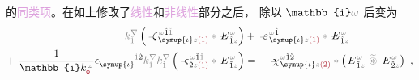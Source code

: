 的\textcolor{Plum}{同类项}。在如上修改了\textcolor{Plum}{线性}和\textcolor{Plum}{非线性}部分之后， 除以 $\mathbb{i} \mathcolor{gray}{\omega}$ 后变为
\begin{subequations}
\begin{align}
	\mathcolor{gray}{k^\nabla_{\check{1}}} \left( \xint{\begin{smallmatrix} ~ \\ {}^{}_{\mathcolor{gray}{-}} \\ ~ \end{smallmatrix}}{12}{\zeta}^{\;\! \mathcolor{gray}{\omega} \hat{1} \mathcolor{gray}{\check{1}}}_{\;\! \symup{\iota} \mathcolor{gray}{z} \textcolor{Maroon}{(1)}} \mathcolor{gray}{*} \xint{\mathcolor{gray}{-}}{295}{E}^{\;\!\mathcolor{gray}{\omega}}_{\;\! \hat{1} \mathcolor{gray}{z}} \right) &+ \xint{\begin{smallmatrix} ~ \\ {}^{}_{\mathcolor{gray}{-}} \\ ~ \end{smallmatrix}}{16}{\varepsilon}^{\;\! \mathcolor{gray}{\omega} \hat{1}}_{\;\! \symup{\iota} \mathcolor{gray}{z} \textcolor{Maroon}{(1)}} \mathcolor{gray}{*} \xint{\mathcolor{gray}{-}}{295}{E}^{\;\!\mathcolor{gray}{\omega}}_{\;\! \hat{1} \mathcolor{gray}{z}}  \label{eq:nonlinear(2)-wave_wkrho-simplify1} \\ 
	+~ \frac{1}{\mathbb{i} k_{\textcolor{Maroon}{\mathsf{o}}}^{\;\! \mathcolor{gray}{\omega}}} \epsilon^{\hphantom{\symup{\iota}}\mathcolor{gray}{\dot{1}}\dot{2}}_{\symup{\iota}} \mathcolor{gray}{k^\nabla_{\dot{1}}} \mathcolor{gray}{k^\nabla_{\check{1}}} \left( \xint{\begin{smallmatrix} ~ \\ {}^{}_{\mathcolor{gray}{-}} \\ ~ \end{smallmatrix}}{13}{\varsigma}^{\;\! \mathcolor{gray}{\omega} \hat{1} \mathcolor{gray}{\check{1}}}_{\;\! \dot{2} \mathcolor{gray}{z} \textcolor{Maroon}{(1)}} \mathcolor{gray}{*} \xint{\mathcolor{gray}{-}}{295}{E}^{\;\!\mathcolor{gray}{\omega}}_{\;\! \hat{1} \mathcolor{gray}{z}} \right) &= - ~\xint{{}^{}_{\mathcolor{gray}{-}}}{23}{\chi}^{\;\! \mathcolor{gray}{\omega} \hat{1} \hat{2}}_{\;\! \symup{\iota} \mathcolor{gray}{z} \textcolor{Maroon}{(2)}} \mathcolor{gray}{*} \left( \xint{\mathcolor{gray}{-}}{295}{E}^{\;\!\mathcolor{gray}{\omega}}_{\;\! \hat{1} \mathcolor{gray}{z}} ~\mathcolor{gray}{\widetilde \circledast}~ \xint{\mathcolor{gray}{-}}{295}{E}^{\;\!\mathcolor{gray}{\omega}}_{\;\! \hat{2} \mathcolor{gray}{z}} \right)~, \label{eq:nonlinear(2)-wave_wkrho-simplify1-2}
\end{align}
\end{subequations}
